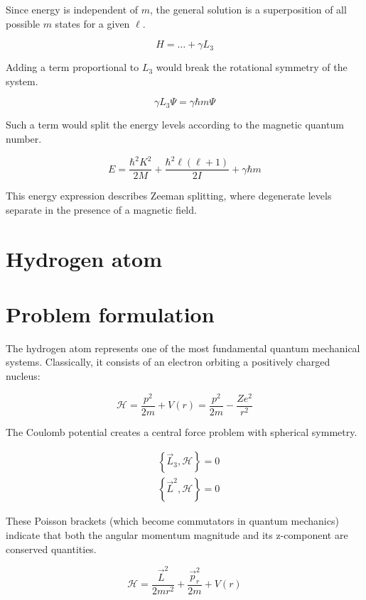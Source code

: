Since energy is independent of $m$, the general solution is a superposition of all possible $m$ states for a given $\ell$.

\begin{equation}
H=\ldots+\gamma L_{3}
\end{equation}

Adding a term proportional to $L_3$ would break the rotational symmetry of the system.

\begin{equation}
\gamma L_{3} \Psi=\gamma \hbar m \Psi
\end{equation}

Such a term would split the energy levels according to the magnetic quantum number.

\begin{equation}
E=\frac{\hbar^{2} K^{2}}{2 M}+\frac{\hbar^{2} \ell(\ell+1)}{2 I}+\gamma \hbar m
\end{equation}

This energy expression describes Zeeman splitting, where degenerate levels separate in the presence of a magnetic field.

\section{Hydrogen atom}
\section{Problem formulation}
The hydrogen atom represents one of the most fundamental quantum mechanical systems. Classically, it consists of an electron orbiting a positively charged nucleus:

\begin{equation}
\mathcal{H}=\frac{p^{2}}{2 m}+V(r)=\frac{p^{2}}{2 m}-\frac{Z e^{2}}{r^{2}}
\end{equation}

The Coulomb potential creates a central force problem with spherical symmetry.

\begin{align}
& \left\{\vec{L}_{3}, \mathcal{H}\right\}=0 \\
& \left\{\vec{L}^{2}, \mathcal{H}\right\}=0
\end{align}

These Poisson brackets (which become commutators in quantum mechanics) indicate that both the angular momentum magnitude and its z-component are conserved quantities.

\begin{equation}
\mathcal{H}=\frac{\vec{L}^{2}}{2 m r^{2}}+\frac{\vec{p}_{r}^{2}}{2 m}+V(r)
\end{equation}

